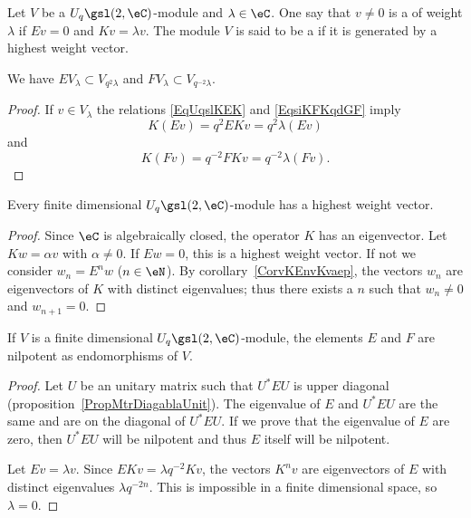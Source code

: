 Let \( V\) be a \( U_q\gsl(2,\eC)\)-module and \( \lambda\in\eC\). One say that \( v\neq 0\) is a  of weight \( \lambda\) if \( Ev=0\) and \( Kv=\lambda v\). The module \( V\) is said to be a  if it is generated by a highest weight vector.

\begin{lemma}
	We have \( E V_{\lambda}\subset V_{q^2\lambda}\) and \( FV_{\lambda}\subset V_{q^{-2}\lambda}\).
\end{lemma}

\begin{proof}
	If \( v\in V_{\lambda}\) the relations \eqref{EqUqslKEK} and \eqref{EqsiKFKqdGF} imply
	\begin{equation}
		K(Ev)=q^2EKv=q^2\lambda(Ev)
	\end{equation}
	and
	\begin{equation}
		K(Fv)=q^{-2}FKv=q^{-2}\lambda(Fv).
	\end{equation}
\end{proof}

\begin{proposition}     \label{PropFDmodulehashiweightvec}
	Every finite dimensional \( U_q\gsl(2,\eC)\)-module has a highest weight vector.
\end{proposition}

\begin{proof}
	Since \( \eC\) is algebraically closed, the operator \( K\) has an eigenvector. Let \( Kw=\alpha v\) with \( \alpha\neq 0\). If \( Ew=0\), this is a highest weight vector. If not we consider \( w_n=E^nw\) (\( n\in\eN\)). By corollary~\ref{CorvKEnvKvaep}, the vectors \( w_n\) are eigenvectors of \( K\) with distinct eigenvalues; thus there exists a \( n\) such that \( w_n\neq 0\) and \( w_{n+1}=0\).
\end{proof}

\begin{lemma}
	If \( V\) is a finite dimensional \( U_q\gsl(2,\eC)\)-module, the elements \( E\) and \( F\) are nilpotent as endomorphisms of \( V\).
\end{lemma}

\begin{proof}
	Let \( U\) be an unitary matrix such that \( U^*EU\) is upper diagonal (proposition~\ref{PropMtrDiagablaUnit}). The eigenvalue of \( E\) and \( U^*EU\) are the same and are on the diagonal of \( U^*EU\). If we prove that the eigenvalue of \( E\) are zero, then \( U^*EU\) will be nilpotent and thus \( E\) itself will be nilpotent.

	Let \( Ev=\lambda v\). Since \( EKv=\lambda q^{-2}Kv\), the vectors \( K^nv\) are eigenvectors of \( E\) with distinct eigenvalues \( \lambda q^{-2n}\). This is impossible in a finite dimensional space, so \( \lambda=0\).
\end{proof}

